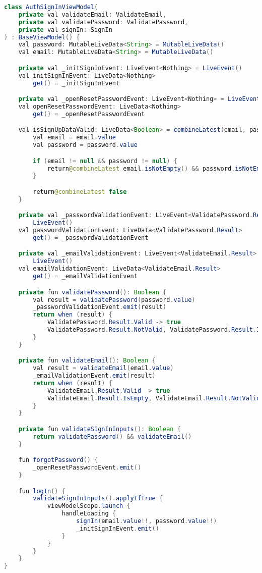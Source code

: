 \begin{lstlisting}[language=Java,label={lst:auth_sign_in_vm},caption={AuthSignInViewModel}]
class AuthSignInViewModel(
    private val validateEmail: ValidateEmail,
    private val validatePassword: ValidatePassword,
    private val signIn: SignIn
) : BaseViewModel() {
    val password: MutableLiveData<String> = MutableLiveData()
    val email: MutableLiveData<String> = MutableLiveData()

    private val _initSignInEvent: LiveEvent<Nothing> = LiveEvent()
    val initSignInEvent: LiveData<Nothing>
        get() = _initSignInEvent

    private val _openResetPasswordEvent: LiveEvent<Nothing> = LiveEvent()
    val openResetPasswordEvent: LiveData<Nothing>
        get() = _openResetPasswordEvent

    val isSignUpDataValid: LiveData<Boolean> = combineLatest(email, password) {
        val email = email.value
        val password = password.value

        if (email != null && password != null) {
            return@combineLatest email.isNotEmpty() && password.isNotEmpty()
        }

        return@combineLatest false
    }

    private val _passwordValidationEvent: LiveEvent<ValidatePassword.Result> =
        LiveEvent()
    val passwordValidationEvent: LiveData<ValidatePassword.Result>
        get() = _passwordValidationEvent

    private val _emailValidationEvent: LiveEvent<ValidateEmail.Result> =
        LiveEvent()
    val emailValidationEvent: LiveData<ValidateEmail.Result>
        get() = _emailValidationEvent

    private fun validatePassword(): Boolean {
        val result = validatePassword(password.value)
        _passwordValidationEvent.emit(result)
        return when (result) {
            ValidatePassword.Result.Valid -> true
            ValidatePassword.Result.NotValid, ValidatePassword.Result.IsEmpty -> false
        }
    }

    private fun validateEmail(): Boolean {
        val result = validateEmail(email.value)
        _emailValidationEvent.emit(result)
        return when (result) {
            ValidateEmail.Result.Valid -> true
            ValidateEmail.Result.IsEmpty, ValidateEmail.Result.NotValid -> false
        }
    }

    private fun validateSignInInputs(): Boolean {
        return validatePassword() && validateEmail()
    }

    fun forgotPassword() {
        _openResetPasswordEvent.emit()
    }

    fun logIn() {
        validateSignInInputs().applyIfTrue {
            viewModelScope.launch {
                handleLoading {
                    signIn(email.value!!, password.value!!)
                    _initSignInEvent.emit()
                }
            }
        }
    }
}
\end{lstlisting}

